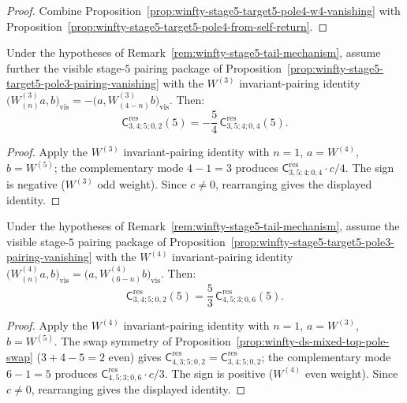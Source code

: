 \begin{proof}
Combine Proposition~\ref{prop:winfty-stage5-target5-pole4-w4-vanishing} with
Proposition~\ref{prop:winfty-stage5-target5-pole4-from-self-return}.
\end{proof}

\begin{proposition}
\label{prop:winfty-stage5-tail-from-w3-pairing}
Under the hypotheses of
Remark~\ref{rem:winfty-stage5-tail-mechanism}, assume further
the visible stage-$5$ pairing package of
Proposition~\ref{prop:winfty-stage5-target5-pole3-pairing-vanishing}
with the $W^{(3)}$ invariant-pairing identity
$\bigl(W^{(3)}_{(n)}a,b\bigr)_{\mathrm{vis}}
=-\bigl(a,W^{(3)}_{(4-n)}b\bigr)_{\mathrm{vis}}$.
Then:
\[
\mathsf{C}^{\mathrm{res}}_{3,4;5;0,2}(5)
=
-\frac{5}{4}\,
\mathsf{C}^{\mathrm{res}}_{3,5;4;0,4}(5).
\]
\end{proposition}

\begin{proof}
Apply the $W^{(3)}$ invariant-pairing identity with \(n=1\), \(a=W^{(4)}\), \(b=W^{(5)}\); the complementary mode \(4-1=3\) produces \(\mathsf{C}^{\mathrm{res}}_{3,5;4;0,4}\cdot c/4\). The sign is negative (\(W^{(3)}\) odd weight). Since \(c\neq 0\), rearranging gives the displayed identity.
\end{proof}

\begin{proposition}
\label{prop:winfty-stage5-tail-from-w4-pairing}
Under the hypotheses of
Remark~\ref{rem:winfty-stage5-tail-mechanism}, assume the visible stage-$5$ pairing package of
Proposition~\ref{prop:winfty-stage5-target5-pole3-pairing-vanishing}
with the $W^{(4)}$ invariant-pairing identity
$\bigl(W^{(4)}_{(n)}a,b\bigr)_{\mathrm{vis}}
=\bigl(a,W^{(4)}_{(6-n)}b\bigr)_{\mathrm{vis}}$.
Then:
\[
\mathsf{C}^{\mathrm{res}}_{3,4;5;0,2}(5)
=
\frac{5}{3}\,
\mathsf{C}^{\mathrm{res}}_{4,5;3;0,6}(5).
\]
\end{proposition}

\begin{proof}
Apply the $W^{(4)}$ invariant-pairing identity with \(n=1\), \(a=W^{(3)}\), \(b=W^{(5)}\). The swap symmetry of Proposition~\ref{prop:winfty-ds-mixed-top-pole-swap} (\(3+4-5=2\) even) gives \(\mathsf{C}^{\mathrm{res}}_{4,3;5;0,2}=\mathsf{C}^{\mathrm{res}}_{3,4;5;0,2}\); the complementary mode \(6-1=5\) produces \(\mathsf{C}^{\mathrm{res}}_{4,5;3;0,6}\cdot c/3\). The sign is positive (\(W^{(4)}\) even weight). Since \(c\neq 0\), rearranging gives the displayed identity.
\end{proof}

